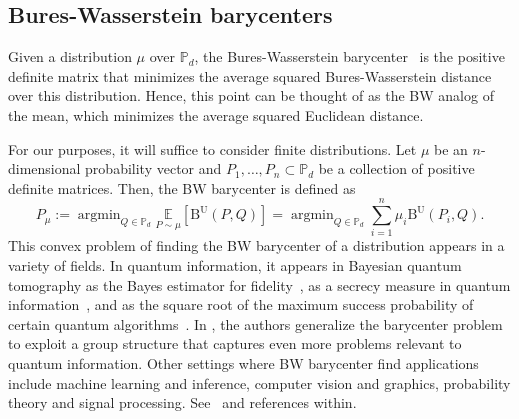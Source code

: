\documentclass[12pt]{article}
\theoremstyle{definition}
\DeclareMathOperator*{\argmin}{argmin}
\begin{document}


\subsection{Bures-Wasserstein barycenters}

Given a distribution $\mu$ over $\mathbb P_d$, the Bures-Wasserstein barycenter~\cite{agueh2011barycenters, alvarez2016fixed, chewi2020gradient, bhatia2019bures, zemel2019frechet} is the positive definite matrix that minimizes the average squared Bures-Wasserstein distance over this distribution. Hence, this point can be thought of as the BW analog of the mean, which minimizes the average squared Euclidean distance. 

For our purposes, it will suffice to consider finite distributions. Let $\mu$ be an $n$-dimensional probability vector and ${P_1, \ldots, P_n} \subset \mathbb P_d$ be a collection of positive definite matrices. Then, the BW barycenter is defined as
\begin{equation}
    P_\mu := \argmin_{Q \in \mathbb P_d} \underset{P \sim \mu}{\mathbb E} [\mathrm{B}^\text{U}(P, Q)] =  \argmin_{Q \in \mathbb P_d} \sum_{i=1}^{n} \mu_i \mathrm{B}^\text{U}(P_i, Q). 
\end{equation}
This convex problem of finding the BW barycenter of a distribution appears in a variety of fields. In quantum information, it appears in Bayesian quantum tomography as the Bayes estimator for fidelity~\cite{afham2022}, as a secrecy measure in quantum information~\cite{konig2009operational}, and as the square root of the maximum success probability of certain quantum algorithms~\cite{Wilde2023estimating}. In \cite{brahmachari2023fixed}, the authors generalize the barycenter problem to exploit a group structure that captures even more problems relevant to quantum information. Other settings where BW barycenter find applications include machine learning and inference, computer vision and graphics, probability theory and signal processing. See~\cite{chewi2020gradient, altschuler2021averaging, chewi2024statistical} and references within.
\end{document}
